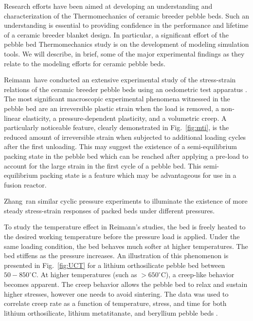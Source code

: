 Research efforts have been aimed at developing an understanding and characterization of the Thermomechanics of ceramic breeder pebble beds. Such an understanding is essential to providing confidence in the performance and lifetime of a ceramic breeder blanket design. In particular, a significant effort of the pebble bed Thermomechanics study is on the development of modeling simulation tools. We will describe, in brief, some of the major experimental findings as they relate to the modeling efforts for ceramic pebble beds.


Reimann\etal~have conducted an extensive experimental study of the stress-strain relations of the ceramic breeder pebble beds using an oedometric test apparatus \cite{Piazza2002811,Reimann:2002kl,Reimann:2003qc,Reimann:2002mi,Reimann:2001il}. The most significant macroscopic experimental phenomena witnessed in the pebble bed are an irreversible plastic strain when the load is removed, a non-linear elasticity, a pressure-dependent plasticity, and a volumetric creep.  A particularly noticeable feature, clearly demonstrated in Fig.~\ref{fig:mti}, is the reduced amount of irreversible strain when subjected to additional loading cycles after the first unloading. This may suggest the existence of a semi-equilibrium packing state in the pebble bed which can be reached after applying a pre-load to account for the large strain in the first cycle of a pebble bed. This semi-equilibrium packing state is a feature which may be advantageous for use in a fusion reactor.

Zhang\etal~ran similar cyclic pressure experiments to illuminate the existence of more steady stress-strain responses of packed beds under different pressures. 

To study the temperature effect in Reimann's studies, the bed is freely heated to the desired working temperature before the pressure load is applied. Under the same loading condition, the bed behaves much softer at higher temperatures. The bed stiffens as the pressure increases. An illustration of this phenomenon is presented in Fig.~\ref{fig:UCT} for a lithium orthosilicate pebble bed between $50-850^\circ$C. At higher temperatures (such as $> 650^\circ$C), a creep-like behavior becomes apparent. The creep behavior allows the pebble bed to relax and sustain higher stresses, however one needs to avoid sintering. The data was used to correlate creep rate as a function of temperature, stress, and time for both lithium orthosilicate, lithium metatitanate, and beryllium pebble beds \cite{Buhler:2002qf,Reimann:2001il,Reimann2005}.


